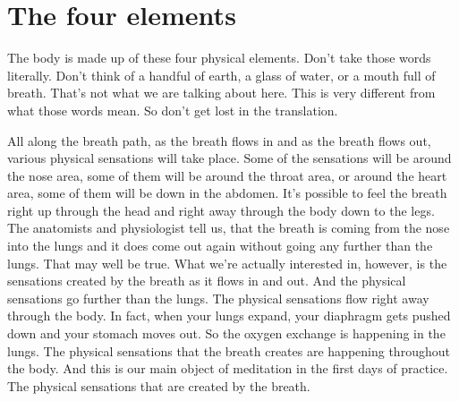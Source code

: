 \documentclass[letterpaper,10pt,english]{sphinxmanual}
\begin{document}
\section{The four elements}
\label{\detokenize{0-b:the-four-elements}}
\sphinxAtStartPar
The body is made up of these four physical elements. Don’t take those
words literally. Don’t think of a handful of earth, a glass of water, or a mouth
full of breath. That’s not what we are talking about here. This is very different from what those words mean. So don’t get lost in the translation.

\sphinxAtStartPar
All along the breath path, as the breath flows in and as the breath flows
out, various physical sensations will take place. Some of the sensations will
be  around  the  nose  area,  some  of  them  will  be  around  the  throat  area,  or
around the heart area, some of them will be down in the abdomen. It’s possible  to  feel  the  breath  right  up  through  the  head  and  right  away  through
  the body down to the legs. The anatomists and physiologist tell us, that the
breath is coming from the nose into the lungs and it does come out again
without going any further than the lungs. That may well be true. What we’re
actually interested in, however, is the sensations created by the breath as it
flows in and out. And the physical sensations go further than the lungs. The
physical  sensations  flow  right  away  through  the  body.  In  fact,  when  your
lungs expand, your diaphragm gets pushed down and your stomach moves
out. So the oxygen exchange is happening in the lungs. The physical sensations  that  the  breath  creates  are  happening  throughout  the  body. And  this
is our main object of meditation in the first days of practice. The physical
sensations that are created by the breath.
\end{document}
